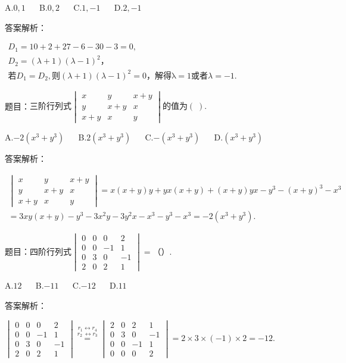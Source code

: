 A.$0,1$ $\quad$ B.$0,2$ $\quad$ C.$1,-1$ $\quad$ D.$2,-1$

答案解析：

$\begin{array}{l}D_1=10+2+27-6-30-3=0,\\D_2=(\lambda+1)(\lambda-1)^2，\\若D_1=D_2,则(\lambda+1)(\lambda-1)^2=0，\mathrm{解得λ}=1\mathrm{或者}\lambda=-1.\end{array}$



题目：$\mathrm{三阶行列式}\begin{vmatrix}x&y&x+y\\y&x+y&x\\x+y&x&y\end{vmatrix}\mathrm{的值为}(\;).$

A.$-2(x^3+y^3)$ $\quad$ B.$2(x^3+y^3)$ $\quad$ C.$-(x^3+y^3)$ $\quad$ D.$(x^3+y^3)$

答案解析：

$\begin{array}{l}\begin{vmatrix}x&y&x+y\\y&x+y&x\\x+y&x&y\end{vmatrix}=x(x+y)y+yx(x+y)+(x+y)yx-y^3-(x+y)^3-x^3\\=3xy(x+y)-y^3-3x^2y-3y^2x-x^3-y^3-x^3=-2(x^3+y^3).\end{array}$



题目：$\mathrm{四阶行列式}\begin{vmatrix}0&0&0&2\\0&0&-1&1\\0&3&0&-1\\2&0&2&1\end{vmatrix}=（）.$

A.$12$ $\quad$ B.$-11$ $\quad$ C.$-12$ $\quad$ D.$11$

答案解析：

$\begin{vmatrix}0&0&0&2\\0&0&-1&1\\0&3&0&-1\\2&0&2&1\end{vmatrix}\overset{r_1\leftrightarrow r_4}{\overset{r_{2\;}\leftrightarrow r_3}=}\begin{vmatrix}2&0&2&1\\0&3&0&-1\\0&0&-1&1\\0&0&0&2\end{vmatrix}=2\times3\times\left(-1\right)\times2=-12.$



